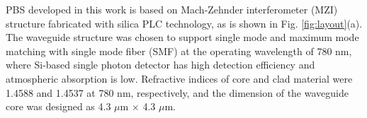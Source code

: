 \documentclass[letterpaper, 10pt]{article}
\begin{document}
PBS developed in this work is based on Mach-Zehnder interferometer (MZI) structure fabricated with silica PLC technology, as is shown in Fig. \ref{fig:layout}(a)\cite{Kim:2012ej, Hashizume:2015ta}.
The waveguide structure was chosen to support single mode and maximum mode matching with single mode fiber (SMF) at the operating wavelength of 780 nm, where Si-based single photon detector has high detection efficiency and atmospheric absorption is low.
Refractive indices of core and clad material were 1.4588 and 1.4537 at 780 nm, respectively, and the dimension of the waveguide core was designed as 4.3 $\mu$m $\times$ 4.3 $\mu$m.
\end{document}
